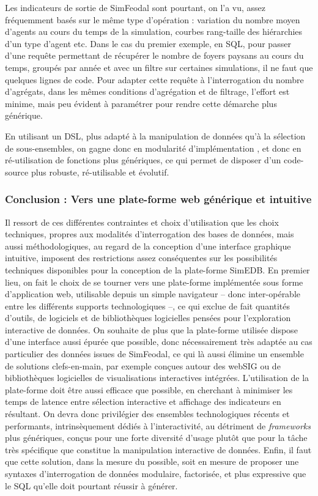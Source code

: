 			Les indicateurs de sortie de SimFeodal sont pourtant, on l'a vu, assez fréquemment basés sur le même type d'opération : variation du nombre moyen d'agents au cours du temps de la simulation, courbes rang-taille des hiérarchies d'un type d'agent etc.
			Dans le cas du premier exemple, en SQL, pour passer d'une requête permettant de récupérer le nombre de foyers paysans au cours du temps, groupés par année et avec un filtre sur certaines simulations, il ne faut que quelques lignes de code. Pour adapter cette requête à l'interrogation du nombre d'agrégats, dans les mêmes conditions d'agrégation et de filtrage, l'effort est minime, mais peu évident à paramétrer pour rendre cette démarche plus générique.
			
			En utilisant un DSL, plus adapté à la manipulation de données qu'à la sélection de sous-ensembles, on gagne donc en modularité d'implémentation , et donc en ré-utilisation de fonctions plus génériques, ce qui permet de disposer d'un code-source plus robuste, ré-utilisable et évolutif.
			
			\subsubsection*{Conclusion : Vers une plate-forme web générique et intuitive}
			
			Il ressort de ces différentes contraintes et choix d'utilisation que les choix techniques, propres aux modalités d'interrogation des bases de données, mais aussi méthodologiques, au regard de la conception d'une interface graphique intuitive, imposent des restrictions assez conséquentes sur les possibilités techniques disponibles pour la conception de la plate-forme SimEDB.
			En premier lieu, on fait le choix de se tourner vers une plate-forme implémentée sous forme d'application web, utilisable depuis un simple navigateur -- donc inter-opérable entre les différents supports technologiques --, ce qui exclue de fait quantités d'outils, de logiciels et de bibliothèques logicielles pensées pour l'exploration interactive de données.
			On souhaite de plus que la plate-forme utilisée dispose d'une interface aussi épurée que possible, donc nécessairement très adaptée au cas particulier des données issues de SimFeodal, ce qui là aussi élimine un ensemble de solutions \og clefs-en-main\fg{}, par exemple conçues autour des \og webSIG\fg{} ou de bibliothèques logicielles de visualisations interactives intégrées.
			L'utilisation de la plate-forme doit être aussi efficace que possible, en cherchant à minimiser les temps de latence entre sélection interactive et affichage des indicateurs en résultant.
			On devra donc privilégier des ensembles technologiques récents et performants, intrinsèquement dédiés à l'interactivité, au détriment de \textit{frameworks} plus génériques, conçus pour une forte diversité d'usage plutôt que pour la tâche très spécifique que constitue la manipulation interactive de données.
			Enfin, il faut que cette solution, dans la mesure du possible, soit en mesure de proposer une syntaxes d'interrogation de données modulaire, factorisée, et plus expressive que le SQL qu'elle doit pourtant réussir à générer.
			

